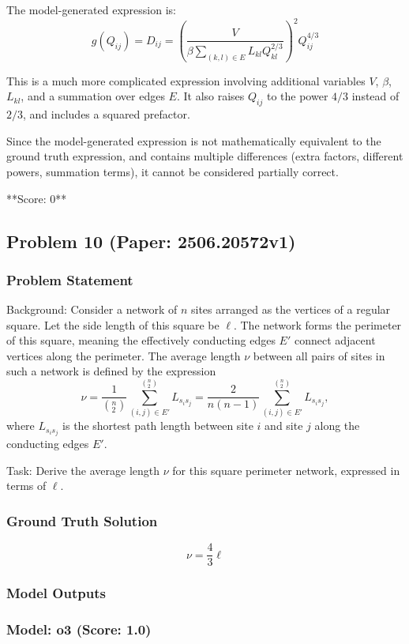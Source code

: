 \documentclass[10pt]{article}
\begin{document}
The model-generated expression is:
\[
g(Q_{ij}) = D_{ij} = \left(\frac{V}{\beta \sum_{(k,l) \in E} L_{kl} Q_{kl}^{2/3}}\right)^2 Q_{ij}^{4/3}
\]

This is a much more complicated expression involving additional variables \(V\), \(\beta\), \(L_{kl}\), and a summation over edges \(E\). It also raises \(Q_{ij}\) to the power \(4/3\) instead of \(2/3\), and includes a squared prefactor.

Since the model-generated expression is not mathematically equivalent to the ground truth expression, and contains multiple differences (extra factors, different powers, summation terms), it cannot be considered partially correct.

**Score: 0**

\newpage
\subsection*{Problem 10 (Paper: 2506.20572v1)}
\subsubsection*{Problem Statement}
Background:
Consider a network of $n$ sites arranged as the vertices of a regular square. Let the side length of this square be $\ell$. The network forms the perimeter of this square, meaning the effectively conducting edges $E'$ connect adjacent vertices along the perimeter. The average length $\nu$ between all pairs of sites in such a network is defined by the expression
$$
\nu = \frac{1}{\left(^n_2\right)} \sum^{\left(^n_2\right)}_{(i,j)\in E'} L_{s_i s_j} = \frac{2}{n(n-1)}\sum^{\left(^n_2\right)}_{(i,j)\in E'} L_{s_i s_j},
$$
where $L_{s_i s_j}$ is the shortest path length between site $i$ and site $j$ along the conducting edges $E'$.

Task:
Derive the average length $\nu$ for this square perimeter network, expressed in terms of $\ell$.

\subsubsection*{Ground Truth Solution}
\[ \boxed{\nu = \frac{4}{3}\ell} \]

\subsubsection*{Model Outputs}
\subsubsection*{Model: o3 (Score: 1.0)}
\end{document}

